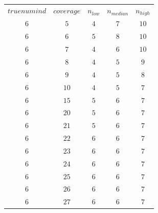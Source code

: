 \begin{table}[H]
\begin{tabular}{ccccc}
$truenumind$ & $coverage$ & $n_{low}$ & $n_{median}$ & $n_{high}$\\
$6$ & $5$ & $4$ & $7$ & $10$\\
$6$ & $6$ & $5$ & $8$ & $10$\\
$6$ & $7$ & $4$ & $6$ & $10$\\
$6$ & $8$ & $4$ & $5$ & $9$\\
$6$ & $9$ & $4$ & $5$ & $8$\\
$6$ & $10$ & $4$ & $5$ & $7$\\
$6$ & $15$ & $5$ & $6$ & $7$\\
$6$ & $20$ & $5$ & $6$ & $7$\\
$6$ & $21$ & $5$ & $6$ & $7$\\
$6$ & $22$ & $6$ & $6$ & $7$\\
$6$ & $23$ & $6$ & $6$ & $7$\\
$6$ & $24$ & $6$ & $6$ & $7$\\
$6$ & $25$ & $6$ & $6$ & $7$\\
$6$ & $26$ & $6$ & $6$ & $7$\\
$6$ & $27$ & $6$ & $6$ & $7$\\
\end{tabular}
\end{table}
 